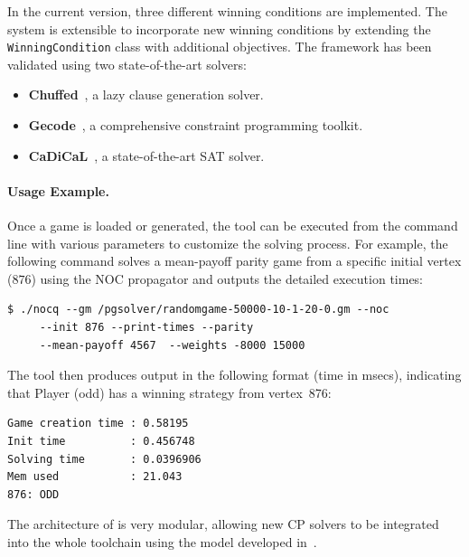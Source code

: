 \documentclass[runningheads]{llncs}
\begin{document}
In the current version, three different winning conditions are implemented. The system is extensible to incorporate new winning conditions by extending the \texttt{WinningCondition} class with additional objectives. The framework has been validated using two state-of-the-art solvers:

\begin{itemize}
    \item \textbf{Chuffed}~\cite{chuffed:2018}, a lazy clause generation solver.
    \item \textbf{Gecode}~\cite{Gecode:2019}, a comprehensive constraint programming toolkit.
    \item \textbf{CaDiCaL}~\cite{Biere:Cadical:2024}, a state-of-the-art SAT solver.
\end{itemize}

\paragraph{Usage Example.}
Once a game is loaded or generated, the tool can be executed from the command line with various parameters to customize the solving process. For example, the following command solves a mean-payoff parity game from a specific initial vertex ($876$) using the NOC propagator and outputs the detailed execution times:

\begin{lstlisting}
$ ./nocq --gm /pgsolver/randomgame-50000-10-1-20-0.gm --noc
     --init 876 --print-times --parity
     --mean-payoff 4567  --weights -8000 15000
\end{lstlisting}

\noindent The tool then produces output in the following format (time in msecs), indicating that Player \odd (odd) has a winning strategy from vertex~876:
\begin{lstlisting}[keepspaces=true]
Game creation time : 0.58195
Init time          : 0.456748
Solving time       : 0.0396906
Mem used           : 21.043
876: ODD
\end{lstlisting}

The architecture of \nocq is very modular, allowing new CP solvers to be integrated into the whole toolchain using the model developed in~\cite{Hernandez:2026:noc}.
\end{document}
